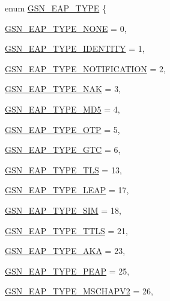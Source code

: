\begin{DoxyCompactItemize}
\item 
enum \hyperlink{a00677_ga95dd88b436cd52a999dda3865de87fe3}{GSN\_\-EAP\_\-TYPE} \{ \par
\hyperlink{a00677_gga95dd88b436cd52a999dda3865de87fe3abe0aad22dfe29df06d642a306ebea61f}{GSN\_\-EAP\_\-TYPE\_\-NONE} =  0, 
\par
\hyperlink{a00677_gga95dd88b436cd52a999dda3865de87fe3a116e2184b38ca7e0eb952b9be5b975ef}{GSN\_\-EAP\_\-TYPE\_\-IDENTITY} =  1, 
\par
\hyperlink{a00677_gga95dd88b436cd52a999dda3865de87fe3a1c5e86e2dd8dc6a75aa824180eb6d81a}{GSN\_\-EAP\_\-TYPE\_\-NOTIFICATION} =  2, 
\par
\hyperlink{a00677_gga95dd88b436cd52a999dda3865de87fe3aa0773e1531c4773594843e21419f2449}{GSN\_\-EAP\_\-TYPE\_\-NAK} =  3, 
\par
\hyperlink{a00677_gga95dd88b436cd52a999dda3865de87fe3a6d97051449aa52519e58503a62a14f81}{GSN\_\-EAP\_\-TYPE\_\-MD5} =  4, 
\par
\hyperlink{a00677_gga95dd88b436cd52a999dda3865de87fe3a89d3a5b0415ab9ee2e618e8b460f0a77}{GSN\_\-EAP\_\-TYPE\_\-OTP} =  5, 
\par
\hyperlink{a00677_gga95dd88b436cd52a999dda3865de87fe3aac896151ff0f797a5945568067ccc447}{GSN\_\-EAP\_\-TYPE\_\-GTC} =  6, 
\par
\hyperlink{a00677_gga95dd88b436cd52a999dda3865de87fe3a98d9efa2ad5fc25861e94d798f8d0c6d}{GSN\_\-EAP\_\-TYPE\_\-TLS} =  13, 
\par
\hyperlink{a00677_gga95dd88b436cd52a999dda3865de87fe3a200b79ff7784577162769d8220d3e8dc}{GSN\_\-EAP\_\-TYPE\_\-LEAP} =  17, 
\par
\hyperlink{a00677_gga95dd88b436cd52a999dda3865de87fe3a8e248c53ed18eda883ff8c941f965dff}{GSN\_\-EAP\_\-TYPE\_\-SIM} =  18, 
\par
\hyperlink{a00677_gga95dd88b436cd52a999dda3865de87fe3ace25bc6165848efaf175e46bc1726545}{GSN\_\-EAP\_\-TYPE\_\-TTLS} =  21, 
\par
\hyperlink{a00677_gga95dd88b436cd52a999dda3865de87fe3a45c1efd67509ef6d8336fe27ac7edad3}{GSN\_\-EAP\_\-TYPE\_\-AKA} =  23, 
\par
\hyperlink{a00677_gga95dd88b436cd52a999dda3865de87fe3a1db5c2e5d5e25299136905db4b3d8d50}{GSN\_\-EAP\_\-TYPE\_\-PEAP} =  25, 
\par
\hyperlink{a00677_gga95dd88b436cd52a999dda3865de87fe3af1cfe046287df0339dfb800b7013f206}{GSN\_\-EAP\_\-TYPE\_\-MSCHAPV2} =  26, 
\par

\end{DoxyCompactItemize}
